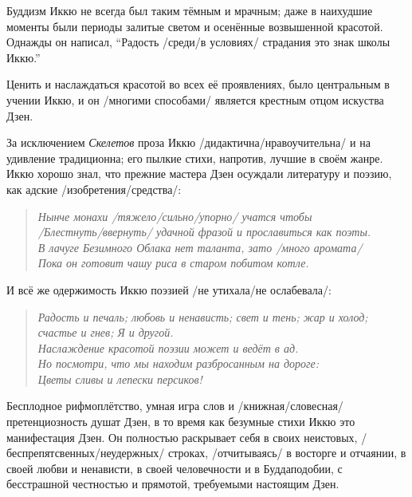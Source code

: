 \begin{ver}
Буддизм Иккю не всегда был таким тёмным и мрачным; даже в
наихудшие моменты были периоды залитые светом и осенённые
возвышенной красотой. Однажды он написал, ``Радость /среди/в условиях/
страдания это знак школы Иккю.''
\end{ver}

\begin{ver}
Ценить и наслаждаться красотой во всех её проявлениях, было
центральным в учении Иккю, и он /многими способами/
является крестным отцом искуства Дзен.
\end{ver}

\begin{ver}
  За исключением {\em Скелетов} проза Иккю /дидактична/нравоучительна/
  и на удивление традиционна; его пылкие стихи, напротив, лучшие в
  своём жанре. Иккю хорошо знал, что прежние мастера Дзен осуждали
  литературу и поэзию, как адские /изобретения/средства/:  
\end{ver}

\begin{ver}
  \begin{verse}\it
  Нынче монахи /тяжело/сильно/упорно/ учатся чтобы\\
  /Блестнуть/ввернуть/ удачной фразой и прославиться как поэты.\\
  В лачуге Безимного Облака нет таланта, зато /много
  аромата/\\
  Пока он готовит чашу риса в старом побитом котле.
  \end{verse}
\end{ver}

\begin{ver}
  И всё же одержимость Иккю поэзией /не утихала/не ослабевала/:
\end{ver}


\begin{ver}
  \begin{verse}\it
    Радость и печаль; любовь и ненависть; свет и тень; жар и холод;
    счастье и гнев; Я и другой.\\
    Наслаждение красотой поэзии может и ведёт в ад.\\
    Но посмотри, что мы находим разбросанным на дороге:\\
    Цветы сливы и лепески персиков!
  \end{verse}
\end{ver}

\begin{ver}
  Бесплодное рифмоплётство, умная игра слов и
  /книжная/словесная/ претенциозность душат Дзен, в то
  время как безумные стихи Иккю это манифестация Дзен. Он полностью
  раскрывает себя в своих неистовых,
  /беспрепятсвенных/неудержных/ строках,
  /отчитываясь/ в восторге  и
  отчаянии,  в своей любви и ненависти, в своей человечности и в
  Буддаподобии, с бесстрашной честностью и прямотой, требуемыми
  настоящим Дзен.
\end{ver}
